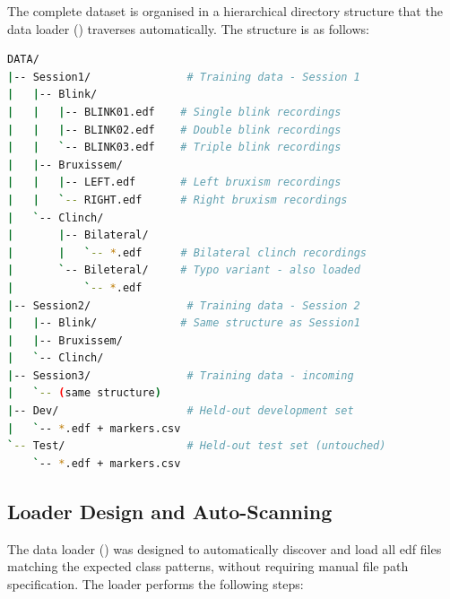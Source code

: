 The complete dataset is organised in a hierarchical directory
structure that the data loader () traverses
automatically. The structure is as follows:

\begin{lstlisting}[language=bash, caption={Dataset directory
structure. Each Session directory contains three sub-folders
corresponding to the three artifact modality groups. Each EDF
file contains one continuous recording of a single artifact
class.}, label={lst:dir_structure}]
DATA/
|-- Session1/               # Training data - Session 1
|   |-- Blink/
|   |   |-- BLINK01.edf    # Single blink recordings
|   |   |-- BLINK02.edf    # Double blink recordings
|   |   `-- BLINK03.edf    # Triple blink recordings
|   |-- Bruxissem/
|   |   |-- LEFT.edf       # Left bruxism recordings
|   |   `-- RIGHT.edf      # Right bruxism recordings
|   `-- Clinch/
|       |-- Bilateral/
|       |   `-- *.edf      # Bilateral clinch recordings
|       `-- Bileteral/     # Typo variant - also loaded
|           `-- *.edf
|-- Session2/               # Training data - Session 2
|   |-- Blink/             # Same structure as Session1
|   |-- Bruxissem/
|   `-- Clinch/
|-- Session3/               # Training data - incoming
|   `-- (same structure)
|-- Dev/                    # Held-out development set
|   `-- *.edf + markers.csv
`-- Test/                   # Held-out test set (untouched)
    `-- *.edf + markers.csv
\end{lstlisting}

\subsection{Loader Design and Auto-Scanning}

The data loader () was designed to automatically
discover and load all \acrshort{edf} files matching the expected
class patterns, without requiring manual file path specification.
The loader performs the following steps:

